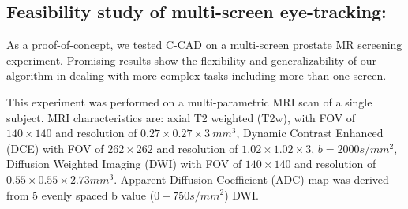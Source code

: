 \documentclass[preprint,12pt]{elsarticle}
\begin{document}




\subsection{Feasibility study of multi-screen eye-tracking:}
As a proof-of-concept, we tested C-CAD on a multi-screen prostate MR screening experiment. Promising results show the flexibility and generalizability of our algorithm in dealing with more complex tasks including more than one screen.

This experiment was performed on a multi-parametric MRI scan of a single subject. MRI characteristics are: axial T2 weighted (T2w), with FOV of $140\times 140$ and resolution of $0.27\times 0.27\times 3~mm^{3}$, Dynamic Contrast Enhanced (DCE) with FOV of $262\times 262$ and resolution of $1.02\times 1.02\times 3$, $b=2000s/mm^{2}$, Diffusion Weighted Imaging (DWI) with FOV of $140\times 140$ and resolution of $0.55\times 0.55\times 2.73 mm^{3}$. Apparent Diffusion Coefficient (ADC) map was derived from 5 evenly spaced b value ($0-750s/mm^{2}$) DWI.
\end{document}
